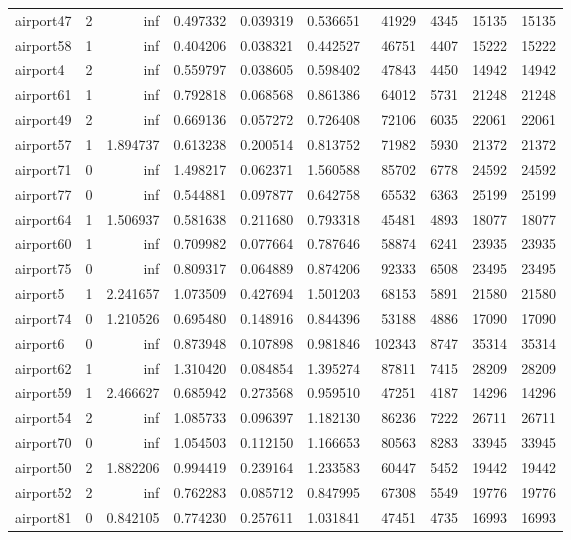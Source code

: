 \begin{longtable}{|l|r|r|r|r|r|r|r|r|r|}
airport47 & 2 & inf & 0.497332 & 0.039319 & 0.536651 & 41929 & 4345 & 15135 & 15135 \\
airport58 & 1 & inf & 0.404206 & 0.038321 & 0.442527 & 46751 & 4407 & 15222 & 15222 \\
airport4 & 2 & inf & 0.559797 & 0.038605 & 0.598402 & 47843 & 4450 & 14942 & 14942 \\
airport61 & 1 & inf & 0.792818 & 0.068568 & 0.861386 & 64012 & 5731 & 21248 & 21248 \\
airport49 & 2 & inf & 0.669136 & 0.057272 & 0.726408 & 72106 & 6035 & 22061 & 22061 \\
airport57 & 1 & 1.894737 & 0.613238 & 0.200514 & 0.813752 & 71982 & 5930 & 21372 & 21372 \\
airport71 & 0 & inf & 1.498217 & 0.062371 & 1.560588 & 85702 & 6778 & 24592 & 24592 \\
airport77 & 0 & inf & 0.544881 & 0.097877 & 0.642758 & 65532 & 6363 & 25199 & 25199 \\
airport64 & 1 & 1.506937 & 0.581638 & 0.211680 & 0.793318 & 45481 & 4893 & 18077 & 18077 \\
airport60 & 1 & inf & 0.709982 & 0.077664 & 0.787646 & 58874 & 6241 & 23935 & 23935 \\
airport75 & 0 & inf & 0.809317 & 0.064889 & 0.874206 & 92333 & 6508 & 23495 & 23495 \\
airport5 & 1 & 2.241657 & 1.073509 & 0.427694 & 1.501203 & 68153 & 5891 & 21580 & 21580 \\
airport74 & 0 & 1.210526 & 0.695480 & 0.148916 & 0.844396 & 53188 & 4886 & 17090 & 17090 \\
airport6 & 0 & inf & 0.873948 & 0.107898 & 0.981846 & 102343 & 8747 & 35314 & 35314 \\
airport62 & 1 & inf & 1.310420 & 0.084854 & 1.395274 & 87811 & 7415 & 28209 & 28209 \\
airport59 & 1 & 2.466627 & 0.685942 & 0.273568 & 0.959510 & 47251 & 4187 & 14296 & 14296 \\
airport54 & 2 & inf & 1.085733 & 0.096397 & 1.182130 & 86236 & 7222 & 26711 & 26711 \\
airport70 & 0 & inf & 1.054503 & 0.112150 & 1.166653 & 80563 & 8283 & 33945 & 33945 \\
airport50 & 2 & 1.882206 & 0.994419 & 0.239164 & 1.233583 & 60447 & 5452 & 19442 & 19442 \\
airport52 & 2 & inf & 0.762283 & 0.085712 & 0.847995 & 67308 & 5549 & 19776 & 19776 \\
airport81 & 0 & 0.842105 & 0.774230 & 0.257611 & 1.031841 & 47451 & 4735 & 16993 & 16993 \\

\end{longtable}
